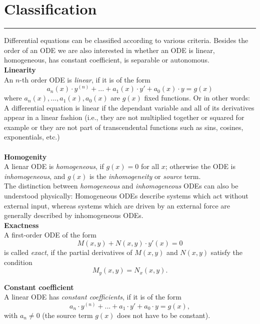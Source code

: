 \section{Classification}
\noindent\rule[\linienAbstand]{\linewidth}{\linienDickeDick}

Differential equations can be classified according to various criteria. Besides the order of an ODE we are also interested in whether an ODE is linear, homogeneous, has constant coefficient, is separable or autonomous.\\

\textbf{Linearity}\\
An $n$-th order ODE is \emph{linear}, if it is of the form
\begin{equation}
  a_n(x) \cdot y^{(n)} + ... + a_1(x) \cdot y' + a_0(x) \cdot y = g(x)
\end{equation}
where $a_n(x), ..., a_1(x), a_0(x)$ are $g(x)$ fixed functions. Or in other words: A differential equation is linear if the dependant variable and all of its derivatives appear in a linear fashion (i.e., they are not multiplied together or squared for example or they are not part of transcendental functions such as sins, cosines, exponentials, etc.)\\\\

\textbf{Homogenity}\\
A lienar ODE is \emph{homogeneous}, if $g(x) = 0$ for all $x$; otherwise the ODE is \emph{inhomogeneous}, and $g(x)$ is the \emph{inhomogeneity} or \emph{source} term.\\
The distinction between \emph{homogeneous} and \emph{inhomogeneous} ODEs can also be understood physically: Homogeneous ODEs describe systems which act without external input, whereas systems which are driven by an external force are generally described by inhomogeneous ODEs.\\

\textbf{Exactness}\\
A first-order ODE of the form
\begin{equation}
  M(x, y) + N(x, y) \cdot y'(x) = 0
\end{equation}
is called \emph{exact}, if the partial derivatives of $M(x, y)$ and $N(x, y)$ satisfy the condition
\begin{equation}
  M_y(x, y) = N_x(x, y).
\end{equation}

\textbf{Constant coefficient}\\
A linear ODE has \emph{constant coefficients}, if it is of the form
\begin{equation}
  a_n \cdot y^{(n)} + ... + a_1 \cdot y'+ a_0 \cdot y = g(x),
\end{equation}
with $a_n \neq 0$ (the source term $g(x)$ does not have to be constant).\\

